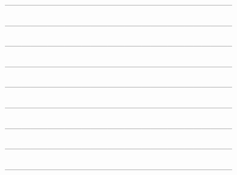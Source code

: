 --------------------------------------------------------------------------------



--------------------------------------------------------------------------------



--------------------------------------------------------------------------------



--------------------------------------------------------------------------------



--------------------------------------------------------------------------------



--------------------------------------------------------------------------------



--------------------------------------------------------------------------------



--------------------------------------------------------------------------------



--------------------------------------------------------------------------------
